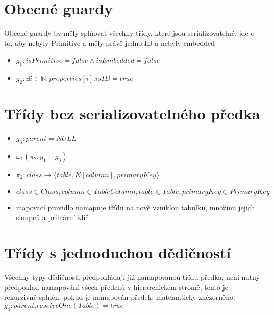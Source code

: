 \documentclass[11pt,a4paper]{article}   	%
\begin{document}
	
	\section{Obecné guardy}
		Obecné guardy by měly splňovat všechny třídy, které jsou serializovatelné, jde
		o to, aby nebyly Primitive a měly právě jedno ID a nebyly embedded
		\begin{itemize}
			\item	$g_1 : isPrimitive = false \wedge isEmbedded = false$
			\item	$g_2 : \exists i \in \mathbb{N} : properties [i] . isID = true$
		\end{itemize}
	
 	\section{Třídy bez serializovatelného předka}
 		\begin{itemize}
 			\item	$g_3 : parent = NULL$ 
 		 	\item	$\omega_1 (\pi_2, g_1 - g_3)$
 		 	\item 	$\pi_2 : class \to  \{table,  K[column], primaryKey\}$
 		 	\item 	$class \in Class, column \in TableColumn, table \in Table,
 		 			primaryKey \in PrimaryKey$
 		 	\item 	mapovací pravidlo namapuje třídu na nově vzniklou tabulku,
 		 			množinu jejich sloupců a primární klíč
 		\end{itemize}
 		 		
 	\section{Třídy s jednoduchou dědičností}
 		Všechny typy dědičnosti předpokládají již namapovanou třídu předka, není
 		nutný předpoklad namapování všech předchů v hierarchickém stromě,
 		tento je rekurzivně splněn, pokud je namapován předek, matematicky
 		znězorněno: \\ 
 		$g_4 : parent.resol veOne(Table) = true$
\end{document}
